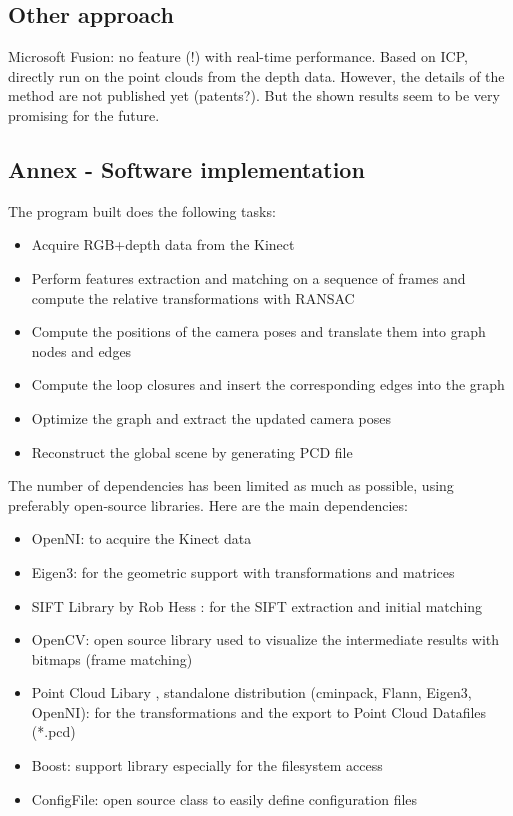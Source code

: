 \section{Other approach}

Microsoft Fusion: no feature (!) with real-time performance. Based on ICP, directly run on the point clouds from the depth data. However, the details of the method are not published yet (patents?). But the shown results seem to be very promising for the future.

\begin{appendices}
\chapter{Annex - Software implementation}

The program built does the following tasks:
\begin{itemize}
\item Acquire RGB+depth data from the Kinect
\item Perform features extraction and matching on a sequence of frames and compute the relative transformations with RANSAC
\item Compute the positions of the camera poses and translate them into graph nodes and edges
\item Compute the loop closures and insert the corresponding edges into the graph
\item Optimize the graph and extract the updated camera poses
\item Reconstruct the global scene by generating PCD file
\end{itemize}

The number of dependencies has been limited as much as possible, using preferably open-source libraries.
Here are the main dependencies:
\begin{itemize}
\item OpenNI: to acquire the Kinect data
\item Eigen3: for the geometric support with transformations and matrices
\item SIFT Library by Rob Hess \cite{hess_sift}: for the SIFT extraction and initial matching
\item OpenCV: open source library used to visualize the intermediate results with bitmaps (frame matching)
\item Point Cloud Libary \cite{Rusu_ICRA2011_PCL}, standalone distribution (cminpack, Flann, Eigen3, OpenNI): for the transformations and the export to Point Cloud Datafiles (*.pcd)
\item Boost: support library especially for the filesystem access
\item ConfigFile: open source class to easily define configuration files
\end{itemize}

\end{appendices}

